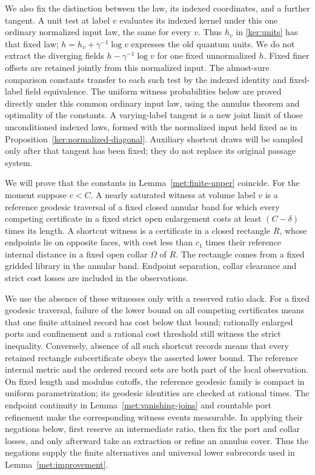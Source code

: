 We also fix the distinction between the law, its indexed coordinates,
and a further tangent.  A unit test at label $v$ evaluates its indexed
kernel under this one ordinary normalized input law, the same for
every $v$.  Thus $h_v$ in
\eqref{ker:units} has that fixed law; $h=h_v+\gamma^{-1}\log v$
expresses the old quantum units.  We do not extract the diverging
fields $h-\gamma^{-1}\log v$ for one fixed unnormalized $h$.
Fixed finer offsets are retained jointly from this normalized input.
The almost-sure comparison constants transfer to each such test by
the indexed identity and fixed-label field equivalence.  The uniform witness probabilities below are proved directly under
this common ordinary input law, using the annulus theorem and
optimality of the constants.  A varying-label tangent is a new joint
limit of those unconditioned indexed laws, formed with the normalized
input held fixed as in Proposition~\ref{ker:normalized-diagonal}.
Auxiliary shortcut draws will be sampled only after that tangent has
been fixed; they do not replace its original passage system.

We will prove that the constants in Lemma~\ref{met:finite-upper}
coincide.  For the moment suppose $c<C$.  A nearly saturated witness at
volume label $v$ is a reference geodesic traversal of a fixed closed
annular band for which every competing certificate in a fixed strict
open enlargement costs at least $(C-\delta)$ times its length.  A
shortcut witness is a certificate in a closed rectangle $R$, whose
endpoints lie on opposite faces, with cost less than $c_1$ times their
reference internal distance in a fixed open collar $\Omega$ of $R$.
The rectangle comes from a fixed gridded library in the annular band.
Endpoint separation, collar clearance and strict cost losses are
included in the observations.

We use the absence of these witnesses only with a reserved ratio
slack.  For a fixed geodesic traversal, failure of the lower bound on
all competing certificates means that one finite attained record has
cost below that bound; rationally enlarged ports and confinement and
a rational cost threshold still witness the strict inequality.
Conversely, absence of all such shortcut records means that every
retained rectangle subcertificate obeys the asserted lower bound.
The reference internal metric and the ordered record sets are both
part of the local observation.  On fixed length and modulus cutoffs,
the reference geodesic family is compact in uniform parametrization;
its geodesic identities are checked at rational times.  The endpoint
continuity in Lemma~\ref{met:vanishing-joins} and countable port
refinement make the corresponding witness events measurable.  In
applying their negations below, first reserve an intermediate ratio,
then fix the port and collar losses, and only afterward take an
extraction or refine an annulus cover.  Thus the negations supply the
finite alternatives and universal lower subrecords used in
Lemma~\ref{met:improvement}.

